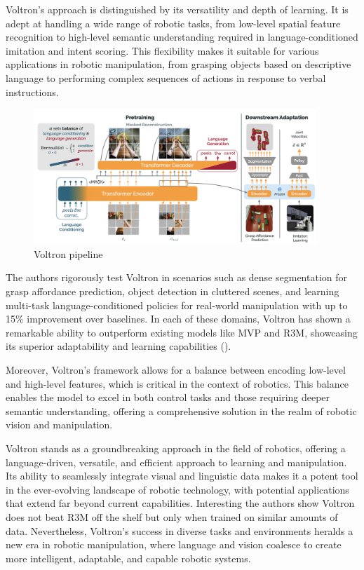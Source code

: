 \documentclass[
  letterpaper,
  DIV=11,
  numbers=noendperiod,
  oneside]{scrreprt}
\theoremstyle{remark}
\begin{document}
Voltron's approach is distinguished by its versatility and depth of
learning. It is adept at handling a wide range of robotic tasks, from
low-level spatial feature recognition to high-level semantic
understanding required in language-conditioned imitation and intent
scoring. This flexibility makes it suitable for various applications in
robotic manipulation, from grasping objects based on descriptive
language to performing complex sequences of actions in response to
verbal instructions.

\begin{figure}[H]

{\centering \includegraphics[width=0.95\textwidth,height=\textheight]{src/Figures/voltron.png}

}

\caption{Voltron pipeline}

\end{figure}%

The authors rigorously test Voltron in scenarios such as dense
segmentation for grasp affordance prediction, object detection in
cluttered scenes, and learning multi-task language-conditioned policies
for real-world manipulation with up to 15\% improvement over baselines.
In each of these domains, Voltron has shown a remarkable ability to
outperform existing models like MVP and R3M, showcasing its superior
adaptability and learning capabilities
().

Moreover, Voltron's framework allows for a balance between encoding
low-level and high-level features, which is critical in the context of
robotics. This balance enables the model to excel in both control tasks
and those requiring deeper semantic understanding, offering a
comprehensive solution in the realm of robotic vision and manipulation.

Voltron stands as a groundbreaking approach in the field of robotics,
offering a language-driven, versatile, and efficient approach to
learning and manipulation. Its ability to seamlessly integrate visual
and linguistic data makes it a potent tool in the ever-evolving
landscape of robotic technology, with potential applications that extend
far beyond current capabilities. Interesting the authors show Voltron
does not beat R3M off the shelf but only when trained on similar amounts
of data. Nevertheless, Voltron's success in diverse tasks and
environments heralds a new era in robotic manipulation, where language
and vision coalesce to create more intelligent, adaptable, and capable
robotic systems.
\end{document}
